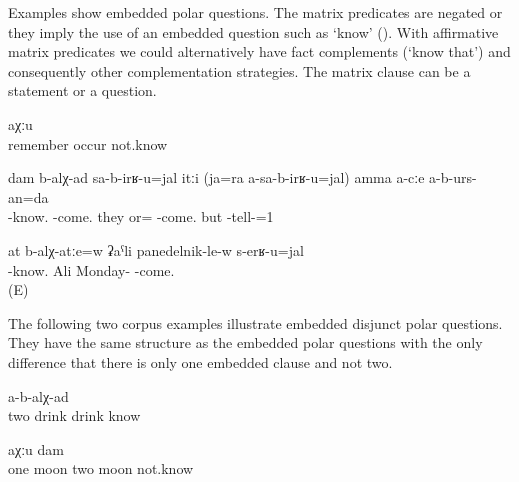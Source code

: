 Examples  show embedded polar questions. The matrix predicates are negated or they imply the use of an embedded question such as `know' (). With affirmative matrix predicates we could alternatively have fact complements (`know that') and consequently other complementation strategies. The matrix clause can be a statement or a question.
%
\begin{exe}
	\ex	\label{ex:I don't know if he is remembering}
	\gll	[han	d-irč-aq-ul=el]	aχːu\\
		remember	occur	not.know\\
	\glt	{}

	\ex	\label{ex:‎‎I know whether they will come (or not), but I am not going to tell you.}
	\gll	dam	b-alχ-ad		sa-b-irʁ-u=jal	itːi		(ja=ra	a-sa-b-irʁ-u=jal)		amma	a-cːe	a-b-urs-an=da\\
			-know.	-come.	they	or= -come.		but		-tell-=1\\
	\glt	{}
	
	\ex	\label{ex:Do you know whether Ali will come on Monday?}
	\gll	at	b-alχ-atːe=w		ʡaˁli	panedelnik-le-w	s-erʁ-u=jal	\\
			-know.		Ali Monday-	-come.\\
	\glt	{} (E)
\end{exe}

The following two corpus examples illustrate embedded disjunct polar questions. They have the same structure as the embedded polar questions with the only difference that there is only one embedded clause and not two. 

\begin{exe}
	\ex	\label{ex:I don't know whether they drank the second or not}
	\gll	[k'ʷi	ibil	b-erčː-ib-le=l	a-b-erčː-ib-le=l]	a-b-alχ-ad\\
		two		drink	drink	know\\
	\glt	{}

	\ex	\label{ex:I don't know if it was one month or two months}
	\gll	[ca	bac=de=l,	k'ʷel	bac=de=l]	aχːu	dam\\
		one	moon	two	moon	not.know	\\
	\glt	{}
\end{exe}


